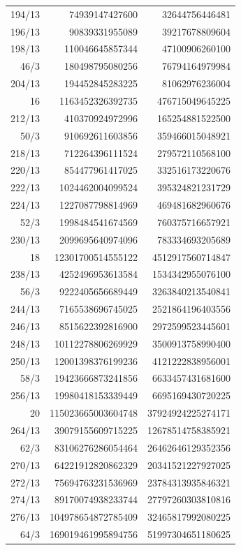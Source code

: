 \begin{longtable}{@{}rrr@{}}
194/13 & 74939147427600 & 32644756446481\\
196/13 & 90839331955089 & 39217678809604\\
198/13 & 110046645857344 & 47100906260100\\
46/3 & 180498795080256 & 76794164979984\\
204/13 & 194452845283225 & 81062976236004\\
16 & 1163452326392735 & 476715049645225\\
212/13 & 410370924972996 & 165254881522500\\
50/3 & 910692611603856 & 359466015048921\\
218/13 & 712264396111524 & 279572110568100\\
220/13 & 854477961417025 & 332516173220676\\
222/13 & 1024462004099524 & 395324821231729\\
224/13 & 1227087798814969 & 469481682960676\\
52/3 & 1998484541674569 & 760375716657921\\
230/13 & 2099695640974096 & 783334693205689\\
18 & 12301700514555122 & 4512917560714847\\
238/13 & 4252496953613584 & 1534342955076100\\
56/3 & 9222405656689449 & 3263840213540841\\
244/13 & 7165538696745025 & 2521864196403556\\
246/13 & 8515622392816900 & 2972599523445601\\
248/13 & 10112278806269929 & 3500913758990400\\
250/13 & 12001398376199236 & 4121222838956001\\
58/3 & 19423666873241856 & 6633457431681600\\
256/13 & 19980418153339449 & 6695169430720225\\
20 & 115023665003604748 & 37924924225274171\\
264/13 & 39079155609715225 & 12678514758385921\\
62/3 & 83106276286054464 & 26462646129352356\\
270/13 & 64221912820862329 & 20341521227927025\\
272/13 & 75694763231536969 & 23784313935846321\\
274/13 & 89170074938233744 & 27797260303810816\\
276/13 & 104978654872785409 & 32465817992080225\\
64/3 & 169019461995894756 & 51997304651180625\\

\end{longtable}
